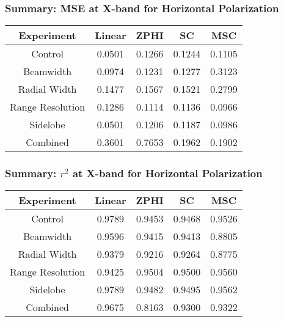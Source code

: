 \begin{frame}
    \frametitle{Summary: MSE at X-band for Horizontal Polarization}
    \begin{center}
        \begin{tabular}{| c | c | c | c | c |}
            \hline
            Experiment & Linear & ZPHI & SC & MSC \\
            \hline
            \hline
            Control & 0.0501 & 0.1266 & 0.1244 & 0.1105 \\
            Beamwidth & 0.0974 & 0.1231 & 0.1277 & 0.3123 \\
            Radial Width & 0.1477 & 0.1567 & 0.1521 & 0.2799 \\
            Range Resolution & 0.1286 & 0.1114 & 0.1136 & 0.0966 \\
            Sidelobe & 0.0501 & 0.1206 & 0.1187 & 0.0986 \\
            Combined & 0.3601 & 0.7653 & 0.1962 & 0.1902 \\
            \hline
        \end{tabular}
    \end{center}
\end{frame}

\begin{frame}
    \frametitle{Summary: $r^2$ at X-band for Horizontal Polarization}
    \begin{center}
        \begin{tabular}{| c | c | c | c | c |}
            \hline
            Experiment & Linear & ZPHI & SC & MSC \\
            \hline
            \hline
            Control & 0.9789 & 0.9453 & 0.9468 & 0.9526 \\
            Beamwidth & 0.9596 & 0.9415 & 0.9413 & 0.8805 \\
            Radial Width & 0.9379 & 0.9216 & 0.9264 & 0.8775 \\
            Range Resolution & 0.9425 & 0.9504 & 0.9500 & 0.9560 \\
            Sidelobe & 0.9789 & 0.9482 & 0.9495 & 0.9562 \\
            Combined & 0.9675 & 0.8163 & 0.9300 & 0.9322 \\
            \hline
        \end{tabular}
    \end{center}
\end{frame}

